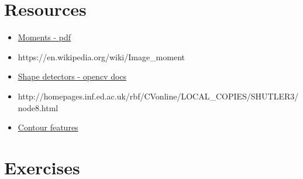 \documentclass[]{article}
\providecommand{\tightlist}{%
  \setlength{\itemsep}{0pt}\setlength{\parskip}{0pt}}
\begin{document}
\section{Resources}\label{resources}

\begin{itemize}
\tightlist
\item
  \href{http://breckon.eu/toby/teaching/dip/opencv/SimpleImageAnalysisbyMoments.pdf}{Moments - pdf}
\item
  https://en.wikipedia.org/wiki/Image\_moment
\item
  \href{http://docs.opencv.org/modules/imgproc/doc/structural\_analysis\_and
  \_shape\_descriptors.html}{Shape detectors - opencv docs}
\item
  http://homepages.inf.ed.ac.uk/rbf/CVonline/LOCAL\_COPIES/SHUTLER3/node8.html
\item
  \href{http://opencv-python-tutroals.readthedocs.org/en/latest/py\_tutorials/py\_imgproc
  /py\_contours/py\_contour\_features/py\_contour\_features.html\#contour-features}{Contour features}
\end{itemize}

\section{Exercises}\label{exercises}
\end{document}
